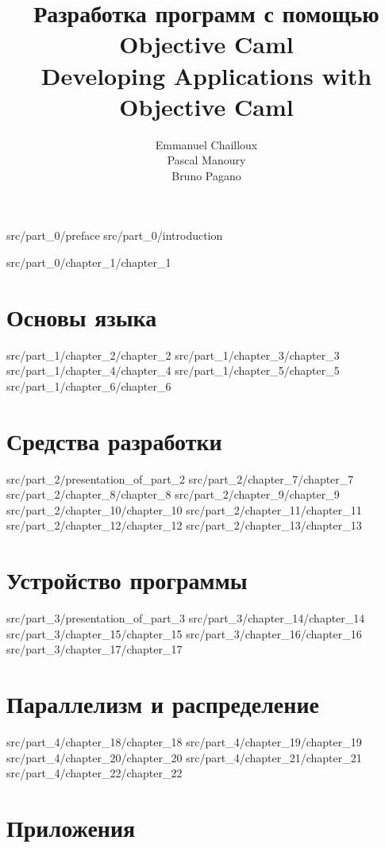 \documentclass[12pt,a4paper]{book}
\begin{document}
\title{Разработка программ с помощью Objective Caml\\
Developing Applications with Objective Caml}
\author{Emmanuel Chailloux\\ Pascal Manoury\\ Bruno Pagano}

\maketitle

 {src/part_0/preface}
 {src/part_0/introduction}

\tableofcontents

 {src/part_0/chapter_1/chapter_1}

\part{Основы языка}
 {src/part_1/chapter_2/chapter_2}
 {src/part_1/chapter_3/chapter_3}
 {src/part_1/chapter_4/chapter_4}
 {src/part_1/chapter_5/chapter_5}
 {src/part_1/chapter_6/chapter_6}

\part{Средства разработки}
 {src/part_2/presentation_of_part_2}
 {src/part_2/chapter_7/chapter_7}
 {src/part_2/chapter_8/chapter_8}
 {src/part_2/chapter_9/chapter_9}
 {src/part_2/chapter_10/chapter_10}
 {src/part_2/chapter_11/chapter_11}
 {src/part_2/chapter_12/chapter_12}
 {src/part_2/chapter_13/chapter_13}

\part{Устройство программы}
 {src/part_3/presentation_of_part_3}
 {src/part_3/chapter_14/chapter_14}
 {src/part_3/chapter_15/chapter_15}
 {src/part_3/chapter_16/chapter_16}
 {src/part_3/chapter_17/chapter_17}

\part{Параллелизм и распределение}
 {src/part_4/chapter_18/chapter_18}
 {src/part_4/chapter_19/chapter_19}
 {src/part_4/chapter_20/chapter_20}
 {src/part_4/chapter_21/chapter_21}
 {src/part_4/chapter_22/chapter_22}

\part{Приложения}
\end{document}
